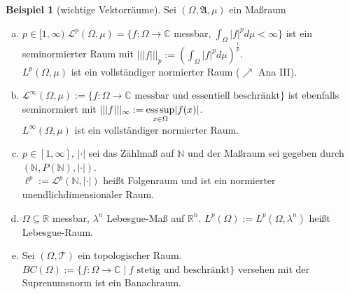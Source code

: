 \documentclass[ngerman]{report}
\theoremstyle{plain}%
\theoremstyle{definition}%
\newtheorem{bsp}[thm]{Beispiel}
\theoremstyle{myStyle}
\newcommand{\C}{\mathbb{C}}
\newcommand{\R}{\mathbb{R}}
\newcommand{\N}{\mathbb{N}}
\newcommand{\hA}{\mathfrak{A}}%
\newcommand{\hL}{\mathcal{L}}
\newcommand{\tT}{\mathcal{T}} %
\newcommand{\ess}{\textnormal{ess}}
\newcommand{\seminorm}[1]{||| #1 |||}
\begin{document}
\begin{bsp}[wichtige Vektorräume]
	Sei $(\Omega,\hA,\mu)$ ein Maßraum
		\begin{enumerate}[(a)]
			\item $p\in[1,\infty)\; \hL^p(\Omega,\mu) = \{f:\Omega \rightarrow \C$ messbar, 
						$\int_\Omega |f|^p d\mu < \infty \}$ ist ein seminormierter Raum mit 
						$\seminorm{f}_p := (\int_\Omega |f|^p d\mu )^{\frac{1}{p}}$.\\
						$L^p(\Omega,\mu)$ ist ein vollständiger normierter Raum ($\nearrow$ Ana III).

			\item $\hL^\infty(\Omega,\mu) := \{f:\Omega \rightarrow \C 
						\text{ messbar und essentiell beschränkt} \}$ ist ebenfalls seminormiert mit 
						$\seminorm{f}_\infty := \underset{x\in\Omega}{\ess \sup} |f(x)|$.\\
						$L^\infty(\Omega,\mu)$ ist ein vollständiger normierter Raum.

			\item $p\in [1,\infty],\, |\cdot|$ sei das Zählmaß auf $\N$ und der Maßraum sei gegeben durch 
						$(\N, P(\N), |\cdot|)$.\\
						$\ell^p := \hL^p(\N, |\cdot|)$ heißt Folgenraum und ist ein normierter unendlichdimensionaler Raum.

			\item $\Omega \subseteq \R$ messbar, $\lambda^n$ Lebesgue-Maß auf $\R^n$.
						$L^p(\Omega) := L^p(\Omega,\lambda^n)$ heißt Lebesgue-Raum.

			\item Sei $(\Omega, \tT)$ ein topologischer Raum. 
						$BC(\Omega) := \{ f: \Omega \rightarrow \C\;|\;f 
						\text{ stetig und beschränkt} \}$ versehen mit der Suprenumsnorm ist ein Banachraum.
	\end{enumerate}

\end{bsp}
\end{document}
